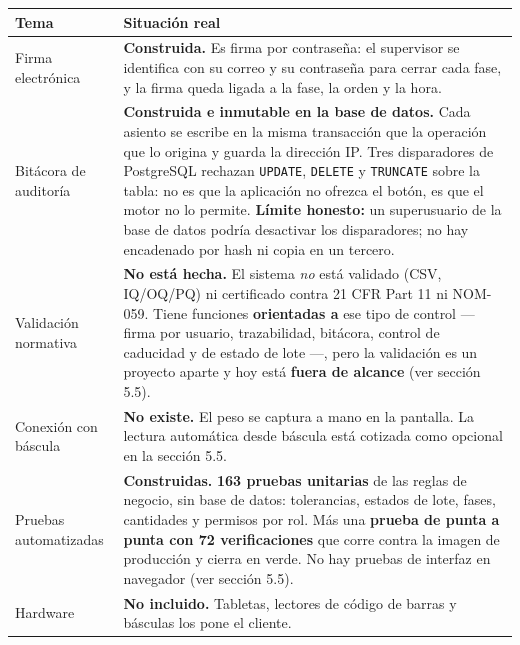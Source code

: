 \documentclass[11pt,letterpaper]{article}
\begin{document}
\noindent
\footnotesize
\begin{tabularx}{\linewidth}{@{}L{5.2cm} X@{}}
\toprule
\textbf{Tema} & \textbf{Situación real} \\
\midrule
Firma electrónica & \textbf{Construida.} Es firma por contraseña: el supervisor se identifica con su correo y su contraseña para cerrar cada fase, y la firma queda ligada a la fase, la orden y la hora. \\
Bitácora de auditoría & \textbf{Construida e inmutable en la base de datos.} Cada asiento se escribe en la misma transacción que la operación que lo origina y guarda la dirección IP. Tres disparadores de PostgreSQL rechazan \texttt{UPDATE}, \texttt{DELETE} y \texttt{TRUNCATE} sobre la tabla: no es que la aplicación no ofrezca el botón, es que el motor no lo permite. \textbf{Límite honesto:} un superusuario de la base de datos podría desactivar los disparadores; no hay encadenado por hash ni copia en un tercero. \\
Validación normativa & \textbf{No está hecha.} El sistema \emph{no} está validado (CSV, IQ/OQ/PQ) ni certificado contra 21 CFR Part 11 ni NOM-059. Tiene funciones \textbf{orientadas a} ese tipo de control --- firma por usuario, trazabilidad, bitácora, control de caducidad y de estado de lote ---, pero la validación es un proyecto aparte y hoy está \textbf{fuera de alcance} (ver sección 5.5). \\
Conexión con báscula & \textbf{No existe.} El peso se captura a mano en la pantalla. La lectura automática desde báscula está cotizada como opcional en la sección 5.5. \\
Pruebas automatizadas & \textbf{Construidas.} \textbf{163 pruebas unitarias} de las reglas de negocio, sin base de datos: tolerancias, estados de lote, fases, cantidades y permisos por rol. Más una \textbf{prueba de punta a punta con 72 verificaciones} que corre contra la imagen de producción y cierra en verde. No hay pruebas de interfaz en navegador (ver sección 5.5). \\
Hardware & \textbf{No incluido.} Tabletas, lectores de código de barras y básculas los pone el cliente. \\
\bottomrule
\end{tabularx}
\normalsize

\vspace{14pt}

\end{document}
